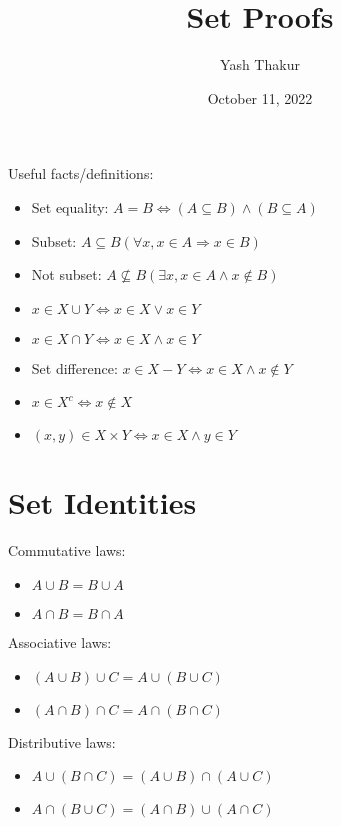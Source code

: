 \documentclass[12pt, leqno]{article}
\title{Set Proofs}
\author{Yash Thakur}
\date{October 11, 2022}
\begin{document}

\maketitle

Useful facts/definitions:
\begin{itemize}
    \item Set equality: $A = B \Leftrightarrow (A \subseteq B) \land (B \subseteq A)$
    \item Subset: $A \subseteq B (\forall x, x \in A \Rightarrow x \in B)$
    \item Not subset: $A \not\subseteq B (\exists x, x \in A \land x \not\in B)$
    \item $x \in X \cup Y \Leftrightarrow x \in X \lor x \in Y$
    \item $x \in X \cap Y \Leftrightarrow x \in X \land x \in Y$
    \item Set difference: $x \in X - Y \Leftrightarrow x \in X \land x \not\in Y$
    \item $x \in X^c \Leftrightarrow x \not\in X$
    \item $(x, y) \in X \times Y \Leftrightarrow x \in X \land y \in Y$
\end{itemize}

\section*{Set Identities}

Commutative laws:
\begin{itemize}
    \item $A \cup B = B \cup A$
    \item $A \cap B = B \cap A$
\end{itemize}

Associative laws:
\begin{itemize}
    \item $(A \cup B) \cup C = A \cup (B \cup C)$
    \item $(A \cap B) \cap C = A \cap (B \cap C)$
\end{itemize}

Distributive laws:
\begin{itemize}
    \item $A \cup (B \cap C) = (A \cup B) \cap (A \cup C)$
    \item $A \cap (B \cup C) = (A \cap B) \cup (A \cap C)$
\end{itemize}
\end{document}

